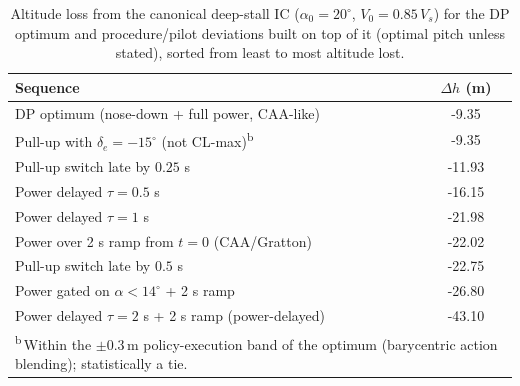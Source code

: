 \begin{table}[hbt!]
    \centering
    \caption{Altitude loss from the canonical deep-stall IC ($\alpha_0=20^\circ$, $V_0=0.85\,V_s$) for the DP optimum and procedure/pilot deviations built on top of it (optimal pitch unless stated), sorted from least to most altitude lost.}
    \label{tab:procedures}
    \begin{tabular}{lc}
        \hline
        Sequence & $\Delta h$ (m) \\
        \hline
        DP optimum (nose-down + full power, CAA-like) & -9.35 \\
        Pull-up with $\delta_e=-15^\circ$ (not CL-max)\textsuperscript{b} & -9.35 \\
        Pull-up switch late by $0.25$ s & -11.93 \\
        Power delayed $\tau=0.5$ s & -16.15 \\
        Power delayed $\tau=1$ s & -21.98 \\
        Power over 2 s ramp from $t=0$ (CAA/Gratton) & -22.02 \\
        Pull-up switch late by $0.5$ s & -22.75 \\
        Power gated on $\alpha<14^\circ$ + 2 s ramp & -26.80 \\
        Power delayed $\tau=2$ s + 2 s ramp (power-delayed) & -43.10 \\
        \hline
        \multicolumn{2}{l}{\footnotesize\textsuperscript{b}\,Within the $\pm0.3$\,m policy-execution band of the optimum (barycentric action blending); statistically a tie.}\\
    \end{tabular}
\end{table}
